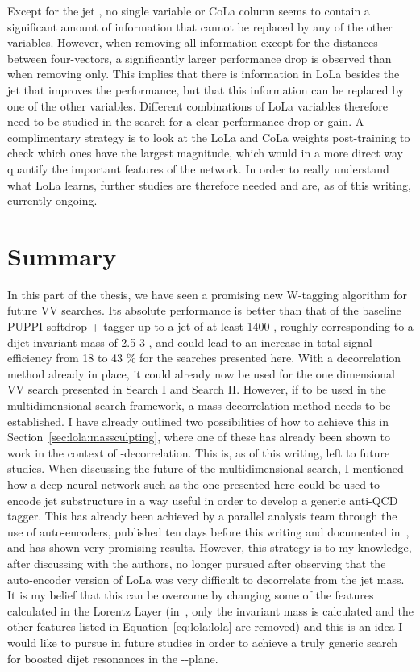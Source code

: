 Except for the jet \PT, no single variable or CoLa column seems to contain a significant amount of information that cannot be replaced by any of the other variables. However, when removing all information except for the distances between four-vectors, a significantly larger performance drop is observed than when removing \PT only. This implies that there is information in LoLa besides the jet \PT that improves the performance, but that this information can be replaced by one of the other variables. Different combinations of LoLa variables therefore need to be studied in the search for a clear performance drop or gain. A complimentary strategy is to look at the LoLa and CoLa weights post-training to check which ones have the largest magnitude, which would in a more direct way quantify the important features of the network. In order to really understand what LoLa learns, further studies are therefore needed and are, as of this writing, currently ongoing.

\chapter{Summary}
\label{sec:lola:outlook}
In this part of the thesis, we have seen a promising new W-tagging algorithm for future VV searches. Its absolute performance is better than that of the baseline PUPPI softdrop + \nsubj tagger up to a jet \PT of at least 1400 \GeV, roughly corresponding to a dijet invariant mass of 2.5-3 \TeV, and could lead to an increase in total signal efficiency from 18 to 43 \% for the searches presented here. With a \PT decorrelation method already in place, it could already now be used for the one dimensional VV search presented in Search I and Search II. However, if to be used in the multidimensional search framework, a mass decorrelation method needs to be established. I have already outlined two possibilities of how to achieve this in Section~\ref{sec:lola:massculpting}, where one of these has already been shown to work in the context of \PT-decorrelation. This is, as of this writing, left to future studies.
\newline
\newline
When discussing the future of the multidimensional search, I mentioned how a deep neural network such as the one presented here could be used to encode jet substructure in a way useful in order to develop a generic anti-QCD tagger. This has already been achieved by a parallel analysis team through the use of auto-encoders, published ten days before this writing and documented in~\cite{Heimel:2018mkt}, and has shown very promising results. However, this strategy is to my knowledge, after discussing with the authors, no longer pursued after observing that the auto-encoder version of LoLa was very difficult to decorrelate from the jet mass. It is my belief that this can be overcome by changing some of the features calculated in the Lorentz Layer (in~\cite{Heimel:2018mkt}, only the invariant mass is calculated and the other features listed in Equation~\ref{eq:lola:lola} are removed) and this is an idea I would like to pursue in future studies in order to achieve a truly generic search for boosted dijet resonances in the \MJO-\MJT-\MVV plane.